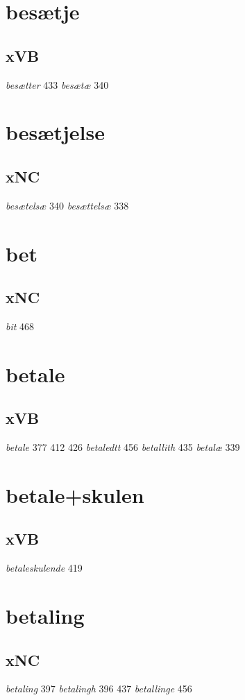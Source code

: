 \documentclass[a4paper,twocolumn]{article}
\begin{document}
\section{besætje}
\label{sec:orgf441baf}
\subsection{xVB}
\label{sec:orgb1d70b0}
\emph{besætter} 433 \emph{besætæ} 340 
\section{besætjelse}
\label{sec:org3207ddd}
\subsection{xNC}
\label{sec:org98f92e4}
\emph{besætelsæ} 340 \emph{besættelsæ} 338 
\section{bet}
\label{sec:org2d411b7}
\subsection{xNC}
\label{sec:org8e5d37a}
\emph{bit} 468 
\section{betale}
\label{sec:org30e5abc}
\subsection{xVB}
\label{sec:org9c0511e}
\emph{betale} 377 412 426 \emph{betaledtt} 456 \emph{betallith} 435 \emph{betalæ} 339 
\section{betale+skulen}
\label{sec:org5e4d381}
\subsection{xVB}
\label{sec:org7b49e0d}
\emph{betaleskulende} 419 
\section{betaling}
\label{sec:org62d693a}
\subsection{xNC}
\label{sec:org9ff9354}
\emph{betaling} 397 \emph{betalingh} 396 437 \emph{betallinge} 456 
\end{document}
